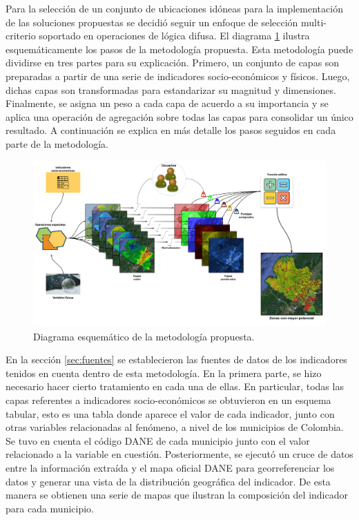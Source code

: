 \label{sec:metodologia}

Para la selección de un conjunto de ubicaciones idóneas para la implementación de las soluciones propuestas se decidió seguir un enfoque de selección 
multi-criterio soportado en operaciones de lógica difusa.  El diagrama \ref{fig:plan} ilustra esquemáticamente los pasos de la metodología propuesta.  Esta 
metodología puede dividirse en tres partes para su explicación.  Primero, un conjunto de capas son preparadas a partir de una serie de indicadores 
socio-económicos y físicos. Luego, dichas capas son transformadas para estandarizar su magnitud y dimensiones.  Finalmente, se asigna un peso a cada capa de 
acuerdo a su importancia y  se aplica una operación de agregación sobre todas las capas para consolidar un único resultado.  A continuación se explica en más 
detalle los pasos seguidos en cada parte de la metodología.

\begin{figure}
    \centering
    \includegraphics[width=1\textwidth]{figures/plan}
    \caption{Diagrama esquemático de la metodología propuesta.}
    \label{fig:plan}
\end{figure}

En la sección \ref{sec:fuentes} se establecieron las fuentes de datos de los indicadores tenidos en cuenta dentro de esta metodología.  En la primera parte, 
se hizo necesario hacer cierto tratamiento en cada una de ellas.  En particular, todas las capas referentes a indicadores socio-económicos 
se obtuvieron en un esquema tabular, esto es una tabla donde aparece el valor de cada indicador, junto con otras variables relacionadas al fenómeno, a nivel de
los municipios de Colombia.  Se tuvo en cuenta el código DANE de cada municipio junto con el valor relacionado a la variable en cuestión.  
Posteriormente, se ejecutó un cruce de datos entre la información extraída y el mapa oficial DANE para georreferenciar los datos y generar una vista de la 
distribución geográfica del indicador.  De esta manera se obtienen una serie de mapas que ilustran la composición del indicador para cada municipio.

